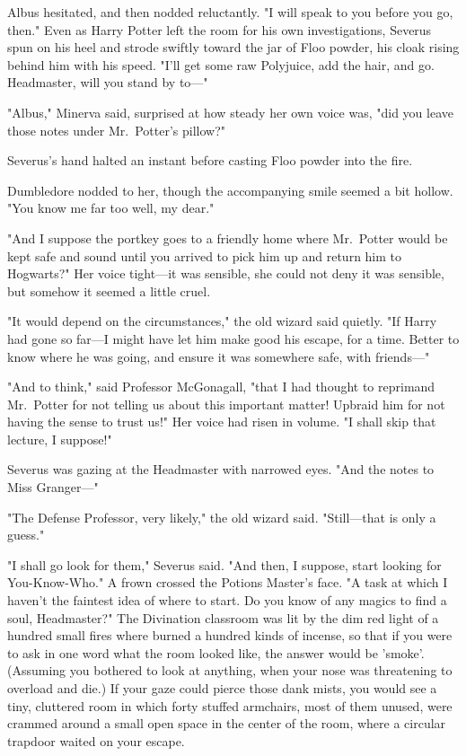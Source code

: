 Albus hesitated, and then nodded reluctantly. "I will speak to you before you 
go, then."
\sbreak
Even as Harry Potter left the room for his own investigations, Severus spun on 
his heel and strode swiftly toward the jar of Floo powder, his cloak rising 
behind him with his speed. "I'll get some raw Polyjuice, add the hair, and go. 
Headmaster, will you stand by to---"

"Albus," Minerva said, surprised at how steady her own voice was, "did you 
leave those notes under Mr.~Potter's pillow?"

Severus's hand halted an instant before casting Floo powder into the fire.

Dumbledore nodded to her, though the accompanying smile seemed a bit hollow. 
"You know me far too well, my dear."

"And I suppose the portkey goes to a friendly home where Mr.~Potter would be 
kept safe and sound until you arrived to pick him up and return him to 
Hogwarts?" Her voice tight---it was sensible, she could not deny it was 
sensible, but somehow it seemed a little cruel.

"It would depend on the circumstances," the old wizard said quietly. "If Harry 
had gone so far---I might have let him make good his escape, for a time. Better 
to know where he was going, and ensure it was somewhere safe, with friends---"

"And to think," said Professor McGonagall, "that I had thought to reprimand 
Mr.~Potter for not telling us about this important matter! Upbraid him for not 
having the sense to trust us!" Her voice had risen in volume. "I shall skip 
that lecture, I suppose!"

Severus was gazing at the Headmaster with narrowed eyes. "And the notes to Miss 
Granger---"

"The Defense Professor, very likely," the old wizard said. "Still---that is 
only a guess."

"I shall go look for them," Severus said. "And then, I suppose, start looking 
for You-Know-Who." A frown crossed the Potions Master's face. "A task at which 
I haven't the faintest idea of where to start. Do you know of any magics to 
find a soul, Headmaster?"
\sbreak
The Divination classroom was lit by the dim red light of a hundred small fires 
where burned a hundred kinds of incense, so that if you were to ask in one word 
what the room looked like, the answer would be 'smoke'. (Assuming you bothered 
to look at anything, when your nose was threatening to overload and die.) If 
your gaze could pierce those dank mists, you would see a tiny, cluttered room 
in which forty stuffed armchairs, most of them unused, were crammed around a 
small open space in the center of the room, where a circular trapdoor waited on 
your escape.

